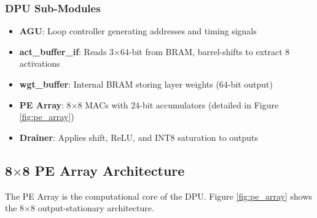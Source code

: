 \documentclass[11pt,a4paper]{article}
\begin{document}
\subsubsection{DPU Sub-Modules}
\begin{itemize}
    \item \textbf{AGU}: Loop controller generating addresses and timing signals
    \item \textbf{act\_buffer\_if}: Reads 3$\times$64-bit from BRAM, barrel-shifts to extract 8 activations
    \item \textbf{wgt\_buffer}: Internal BRAM storing layer weights (64-bit output)
    \item \textbf{PE Array}: 8$\times$8 MACs with 24-bit accumulators (detailed in Figure \ref{fig:pe_array})
    \item \textbf{Drainer}: Applies shift, ReLU, and INT8 saturation to outputs
\end{itemize}

\subsection{8$\times$8 PE Array Architecture}

The PE Array is the computational core of the DPU. Figure \ref{fig:pe_array} shows the 8$\times$8 output-stationary architecture.
\end{document}
